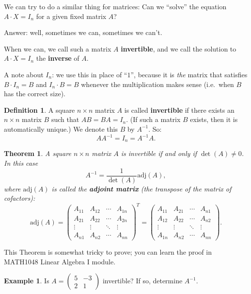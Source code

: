 \documentclass[
  12pt,
  oneside]{book}
\newtheorem{theorem}{Theorem}[chapter]
\theoremstyle{definition}
\newtheorem{definition}{Definition}[chapter]
\theoremstyle{definition}
\newtheorem{example}{Example}[chapter]
\theoremstyle{definition}
\theoremstyle{definition}
\theoremstyle{remark}
\begin{document}
We can try to do a similar thing for matrices: Can we ``solve'' the equation \(A\cdot X=I_n\) for a given fixed matrix \(A\)?

Answer: well, sometimes we can, sometimes we can't.

When we can, we call such a matrix \(A\) \textbf{invertible}, and we call the solution to \(A\cdot X=I_n\) the \textbf{inverse} of \(A\).

A note about \(I_n\): we use this in place of ``\(1\)'', because it is \emph{the} matrix that satisfies \(B\cdot I_n=B\) and \(I_n\cdot B=B\) whenever the multiplication makes sense (i.e.~when \(B\) has the correct size).

\begin{definition}
A square \(n\times n\) matrix \(A\) is called \textbf{invertible} if there exists an \(n\times n\) matrix \(B\) such that \(AB=BA=I_n\). (If such a matrix \(B\) exists, then it is automatically unique.) We denote this \(B\) by \(A^{-1}\). So:
\[
AA^{-1}=I_n=A^{-1}A.
\]
\end{definition}

\begin{theorem}
A square \(n\times n\) matrix \(A\) is invertible if and only if \(\det(A)\not=0\). In this case
\[
\boxed{A^{-1} = \frac{1}{\det(A)}\mathrm{adj}(A)},
\]
where \(\mathrm{adj}(A)\) is called the \textbf{adjoint matrix} (the transpose of the matrix of cofactors):
\[
\mathrm{adj}(A) = \begin{pmatrix}
    A_{11} & A_{12} & \cdots & A_{1n}\\
    A_{21} & A_{22} & \cdots & A_{2n}\\
    \vdots & \vdots & \ddots & \vdots\\
    A_{n1} & A_{n2} & \cdots & A_{nn}
\end{pmatrix}^T = \begin{pmatrix}
    A_{11} & A_{21} & \cdots & A_{n1}\\
    A_{12} & A_{22} & \cdots & A_{n2}\\
    \vdots & \vdots & \ddots & \vdots\\
    A_{1n} & A_{n2} & \cdots & A_{nn}
\end{pmatrix}.
\]
\end{theorem}

This Theorem is somewhat tricky to prove; you can learn the proof in MATH1048 Linear Algebra I module.

\begin{example}
Is \(A=\begin{pmatrix}5&-3\\2&1\end{pmatrix}\) invertible? If so, determine \(A^{-1}\).
\end{example}
\end{document}
